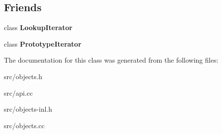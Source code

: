 \subsection*{Friends}
\begin{DoxyCompactItemize}
\item 
\hypertarget{classv8_1_1internal_1_1_object_a44f614b48d67bab95d53634a26593e69}{}class {\bfseries Lookup\+Iterator}\label{classv8_1_1internal_1_1_object_a44f614b48d67bab95d53634a26593e69}

\item 
\hypertarget{classv8_1_1internal_1_1_object_a0325b338f74e8d9f3c0ae53a7ffff684}{}class {\bfseries Prototype\+Iterator}\label{classv8_1_1internal_1_1_object_a0325b338f74e8d9f3c0ae53a7ffff684}

\end{DoxyCompactItemize}


The documentation for this class was generated from the following files\+:\begin{DoxyCompactItemize}
\item 
src/objects.\+h\item 
src/api.\+cc\item 
src/objects-\/inl.\+h\item 
src/objects.\+cc\end{DoxyCompactItemize}
